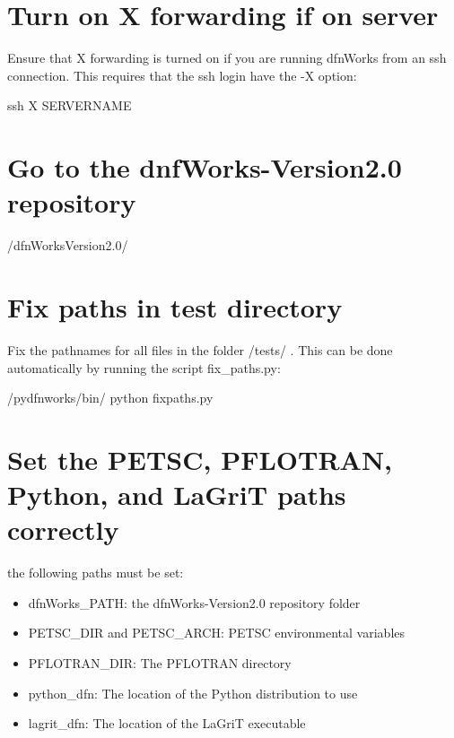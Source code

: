 \documentclass[letterpaper,10pt,english]{sphinxmanual}
\begin{document}
\section{Turn on X forwarding if on server}
\label{\detokenize{tutorial:turn-on-x-forwarding-if-on-server}}
Ensure that X forwarding is turned on if you are running dfnWorks from an ssh connection. This requires that the ssh login have the -X option:

\begin{sphinxVerbatim}[commandchars=\\\{\}]
\PYGZdl{} ssh \PYGZhy{}X SERVER\PYGZus{}NAME
\end{sphinxVerbatim}


\section{Go to the dnfWorks-Version2.0 repository}
\label{\detokenize{tutorial:go-to-the-dnfworks-version2-0-repository}}
\begin{sphinxVerbatim}[commandchars=\\\{\}]
\PYGZdl{}  \PYGZti{}/dfnWorks\PYGZhy{}Version2.0/
\end{sphinxVerbatim}


\section{Fix paths in test directory}
\label{\detokenize{tutorial:fix-paths-in-test-directory}}
Fix the pathnames for all files in the folder /tests/ . This can be done automatically by running the script fix\_paths.py:

\begin{sphinxVerbatim}[commandchars=\\\{\}]
\PYGZdl{}  /pydfnworks/bin/
\PYGZdl{} python fix\PYGZus{}paths.py
\end{sphinxVerbatim}


\section{Set the PETSC, PFLOTRAN, Python, and LaGriT paths correctly}
\label{\detokenize{tutorial:set-the-petsc-pflotran-python-and-lagrit-paths-correctly}}
 the following paths must be set:
\begin{itemize}
\item {} 
dfnWorks\_PATH: the dfnWorks-Version2.0 repository folder

\item {} 
PETSC\_DIR and PETSC\_ARCH: PETSC environmental variables

\item {} 
PFLOTRAN\_DIR: The PFLOTRAN directory

\item {} 
python\_dfn: The location of the Python distribution to use

\item {} 
lagrit\_dfn: The location of the LaGriT executable

\end{itemize}
\end{document}
